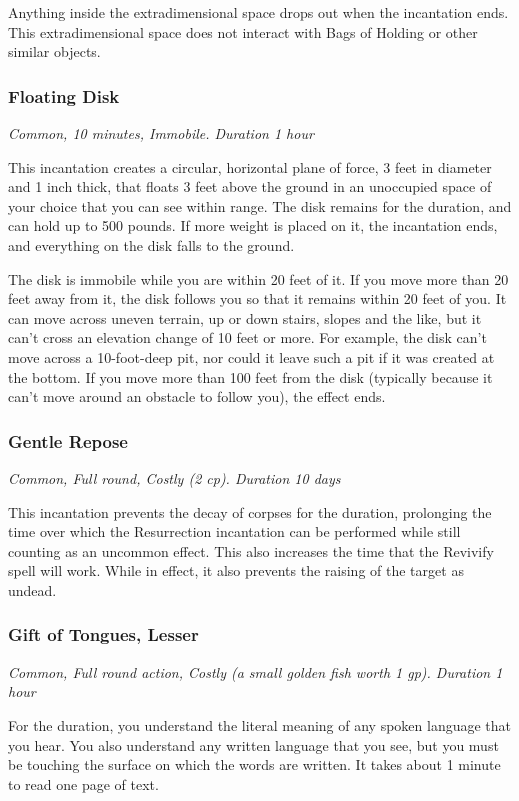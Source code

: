 Anything inside the extradimensional space drops out when the incantation ends. This extradimensional space does not interact with Bags of Holding or other similar objects.

\subsubsection{Floating Disk}
\textit{Common, 10 minutes, Immobile. Duration 1 hour}

This incantation creates a circular, horizontal plane of force, 3 feet in diameter and 1 inch thick, that floats 3 feet above the ground in an unoccupied space of your choice that you can see within range. The disk remains for the duration, and can hold up to 500 pounds. If more weight is placed on it, the incantation ends, and everything on the disk falls to the ground.

The disk is immobile while you are within 20 feet of it. If you move more than 20 feet away from it, the disk follows you so that it remains within 20 feet of you. It can move across uneven terrain, up or down stairs, slopes and the like, but it can't cross an elevation change of 10 feet or more. For example, the disk can't move across a 10-foot-deep pit, nor could it leave such a pit if it was created at the bottom. If you move more than 100 feet from the disk (typically because it can't move around an obstacle to follow you), the effect ends.

\subsubsection{Gentle Repose}
\textit{Common, Full round, Costly (2 cp). Duration 10 days}

This incantation prevents the decay of corpses for the duration, prolonging the time over which the Resurrection incantation can be performed while still counting as an uncommon effect. This also increases the time that the Revivify spell will work. While in effect, it also prevents the raising of the target as undead.

\subsubsection{Gift of Tongues, Lesser}
\textit{Common, Full round action, Costly (a small golden fish worth 1 gp). Duration 1 hour}

For the duration, you understand the literal meaning of any spoken language that you hear. You also understand any written language that you see, but you must be touching the surface on which the words are written. It takes about 1 minute to read one page of text.

